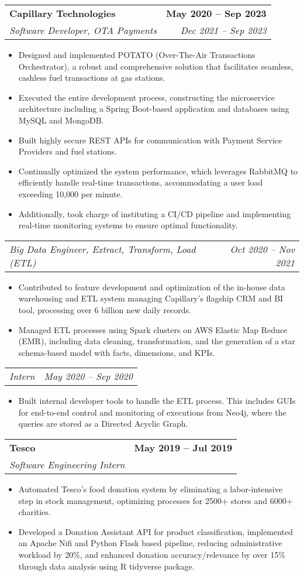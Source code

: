 \documentclass[letterpaper,11pt]{article}
\makeatletter
\newcommand{\resumeItem}[1]{
  \item\small{
    {#1 \vspace{-2pt}}
  }
}
\newcommand{\resumeSubheading}[4]{
  \vspace{-2pt}\item
    \begin{tabular*}{1.0\textwidth}[t]{l@{\extracolsep{\fill}}r}
      \textbf{#1} & \textbf{\small #2} \\
      \textit{\small#3} & \textit{\small #4} \\
    \end{tabular*}\vspace{-7pt}
}
\newcommand{\resumeSubSubheading}[2]{
    \item
    \begin{tabular*}{1.0\textwidth}{l@{\extracolsep{\fill}}r}
      \textit{\small#1} & \textit{\small #2} \\
    \end{tabular*}\vspace{-7pt}
}
\newcommand{\resumeItemListStart}{\begin{itemize}}
\newcommand{\resumeItemListEnd}{\end{itemize}\vspace{-5pt}}
\makeatother
\begin{document}
    \resumeSubheading
      {Capillary Technologies}{May 2020 -- Sep 2023}
      {Software Developer, OTA Payments}{Dec 2021 -- Sep 2023}
      \resumeItemListStart
        \resumeItem{
        Designed and implemented POTATO (Over-The-Air Transactions Orchestrator), a robust and comprehensive solution that facilitates seamless, cashless fuel transactions at gas stations.
        }
        \resumeItem{
        Executed the entire development process, constructing the microservice architecture including a Spring Boot-based application and databases using MySQL and MongoDB.
        }
        \resumeItem{
        Built highly secure REST APIs for communication with Payment Service Providers and fuel stations.
        }
        \resumeItem{
        Continually optimized the system performance, which leverages RabbitMQ to efficiently handle real-time transactions, accommodating a user load exceeding 10,000 per minute.
        }
        \resumeItem{
        Additionally, took charge of instituting a CI/CD pipeline and implementing real-time monitoring systems to ensure optimal functionality.
        }
      \resumeItemListEnd
    \resumeSubSubheading
      {Big Data Engineer, Extract, Transform, Load (ETL)}{Oct 2020 -- Nov 2021}
      \resumeItemListStart
        \resumeItem{Contributed to feature development and optimization of the in-house data warehousing and ETL system managing Capillary’s flagship CRM and BI tool, processing over 6 billion new daily records.}
        \resumeItem{Managed ETL processes using Spark clusters on AWS Elastic Map Reduce (EMR), including data cleaning, transformation, and the generation of a star schema-based model with facts, dimensions, and KPIs.}
      \resumeItemListEnd
    \resumeSubSubheading
      {Intern}{May 2020 -- Sep 2020}
      \resumeItemListStart
        \resumeItem{Built internal developer tools to handle the ETL process. This includes GUIs for end-to-end control and monitoring of executions from Neo4j, where the queries are stored as a Directed Acyclic Graph.}
      \resumeItemListEnd

\pagebreak \vspace*{30pt}

    \resumeSubheading
      {Tesco}{May 2019 -- Jul 2019}
      {Software Engineering Intern}{}
      \resumeItemListStart
        \resumeItem{Automated Tesco's food donation system by eliminating a labor-intensive step in stock management, optimizing processes for 2500+ stores and 6000+ charities.
        }
        \resumeItem{Developed a Donation Assistant API for product classification, implemented an Apache Nifi and Python Flask based pipeline, reducing administrative workload by 20\%, and enhanced donation accuracy/relevance by over 15\% through data analysis using R tidyverse package.
        }
    \resumeItemListEnd
\end{document}
